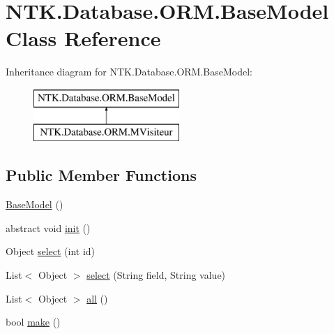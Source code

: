 \hypertarget{class_n_t_k_1_1_database_1_1_o_r_m_1_1_base_model}{}\section{N\+T\+K.\+Database.\+O\+R\+M.\+Base\+Model Class Reference}
\label{class_n_t_k_1_1_database_1_1_o_r_m_1_1_base_model}


 


Inheritance diagram for N\+T\+K.\+Database.\+O\+R\+M.\+Base\+Model\+:\begin{figure}[H]
\begin{center}
\leavevmode
\includegraphics[height=2.000000cm]{d4/dca/class_n_t_k_1_1_database_1_1_o_r_m_1_1_base_model}
\end{center}
\end{figure}
\subsection*{Public Member Functions}
\begin{DoxyCompactItemize}
\item 
\mbox{\hyperlink{class_n_t_k_1_1_database_1_1_o_r_m_1_1_base_model_a17abd002e7bda84ef89d04f5dc222fe6}{Base\+Model}} ()
\item 
abstract void \mbox{\hyperlink{class_n_t_k_1_1_database_1_1_o_r_m_1_1_base_model_a62c00da7e4c99a778e04b0af16dc3938}{init}} ()
\item 
Object \mbox{\hyperlink{class_n_t_k_1_1_database_1_1_o_r_m_1_1_base_model_ad9992bd978af3383673ed717d33fc927}{select}} (int id)
\item 
List$<$ Object $>$ \mbox{\hyperlink{class_n_t_k_1_1_database_1_1_o_r_m_1_1_base_model_ad846e735f4153d31b4e9127343edf3c3}{select}} (String field, String value)
\item 
List$<$ Object $>$ \mbox{\hyperlink{class_n_t_k_1_1_database_1_1_o_r_m_1_1_base_model_ad3ca5afeb20a25305948eac6035d91fa}{all}} ()
\item 
bool \mbox{\hyperlink{class_n_t_k_1_1_database_1_1_o_r_m_1_1_base_model_af9bc8b16291df7fa9120b1f21206c148}{make}} ()
\end{DoxyCompactItemize}
